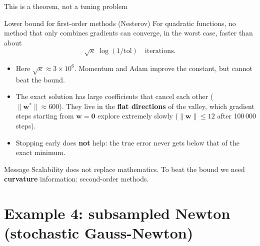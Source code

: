 \documentclass[10pt,aspectratio=169]{beamer}
\newcommand{\hl}[1]{\textcolor{accent}{\textbf{#1}}}
\begin{document}
\begin{frame}{This is a theorem, not a tuning problem}
  \begin{block}{Lower bound for first-order methods (Nesterov)}
    For quadratic functions, no method that only combines gradients can
    converge, in the worst case, faster than about
    \[
      \sqrt{\kappa}\;\log(1/\text{tol}) \quad \text{iterations.}
    \]
  \end{block}
  \begin{itemize}
    \item Here $\sqrt{\kappa} \approx 3\times10^{6}$. Momentum and Adam improve
          the constant, but cannot beat the bound.
    \item The exact solution has large coefficients that cancel each other
          ($\lVert\bm{w}^\ast\rVert \approx 600$). They live in the
          \hl{flat directions} of the valley, which gradient steps starting
          from $\bm{w}=\bm{0}$ explore extremely slowly
          ($\lVert\bm{w}\rVert \le 12$ after 100\,000 steps).
    \item Stopping early does \hl{not} help: the true error never gets
          below that of the exact minimum.
  \end{itemize}
  \vspace{0.3em}
  \begin{alertblock}{Message}
    Scalability does not replace mathematics. To beat the bound we need
    \hl{curvature} information: second-order methods.
  \end{alertblock}
\end{frame}

\section{Example 4: subsampled Newton (stochastic Gauss-Newton)}
\end{document}

